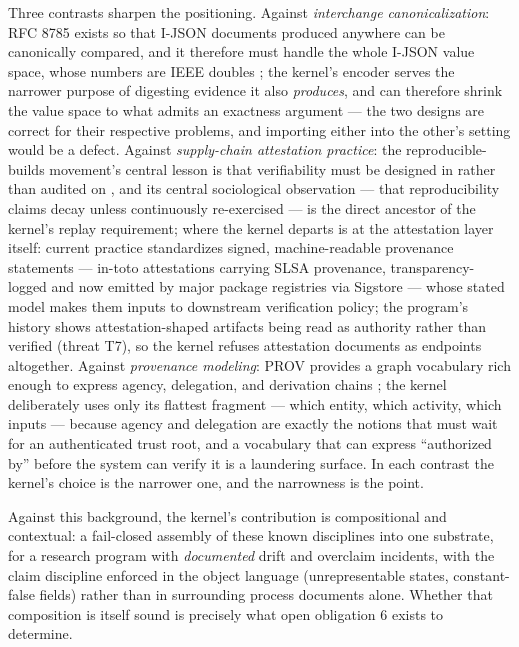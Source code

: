 Three contrasts sharpen the positioning. Against \emph{interchange canonicalization}: RFC 8785 exists so that I-JSON documents produced anywhere can be canonically compared, and it therefore must handle the whole I-JSON value space, whose numbers are IEEE doubles \cite{jcs}; the kernel's encoder serves the narrower purpose of digesting evidence it also \emph{produces}, and can therefore shrink the value space to what admits an exactness argument --- the two designs are correct for their respective problems, and importing either into the other's setting would be a defect. Against \emph{supply-chain attestation practice}: the reproducible-builds movement's central lesson is that verifiability must be designed in rather than audited on \cite{reprobuilds}, and its central sociological observation --- that reproducibility claims decay unless continuously re-exercised --- is the direct ancestor of the kernel's replay requirement; where the kernel departs is at the attestation layer itself: current practice standardizes signed, machine-readable provenance statements --- in-toto attestations carrying SLSA provenance, transparency-logged and now emitted by major package registries via Sigstore \cite{intoto,slsa,sigstore} --- whose stated model makes them inputs to downstream verification policy; the program's history shows attestation-shaped artifacts being read as authority rather than verified (threat T7), so the kernel refuses attestation documents as endpoints altogether. Against \emph{provenance modeling}: PROV provides a graph vocabulary rich enough to express agency, delegation, and derivation chains \cite{prov}; the kernel deliberately uses only its flattest fragment --- which entity, which activity, which inputs --- because agency and delegation are exactly the notions that must wait for an authenticated trust root, and a vocabulary that can express ``authorized by'' before the system can verify it is a laundering surface. In each contrast the kernel's choice is the narrower one, and the narrowness is the point.

Against this background, the kernel's contribution is compositional and contextual: a fail-closed assembly of these known disciplines into one substrate, for a research program with \emph{documented} drift and overclaim incidents, with the claim discipline enforced in the object language (unrepresentable states, constant-false fields) rather than in surrounding process documents alone. Whether that composition is itself sound is precisely what open obligation 6 exists to determine.

